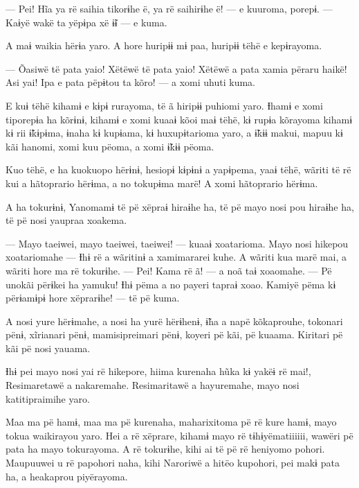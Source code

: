 
--- Pei! Hĩa ya rë saihia tikorɨhe ë, ya rë saihirɨhe ë! --- e kuuroma,
porepɨ. --- Kaɨyë wakë ta yëpɨpa xë ɨ̃ɨ --- e kuma. 

A maɨ waikia hërɨa yaro. A hore huripɨɨ mɨ paa, huripɨɨ tëhë e
kepɨrayoma. 


--- Õasiwë të pata yaio! Xëtëwë të pata yaio! Xëtëwë a pata xamia përaru
haikë! Asi yai! Ipa e pata pëpɨtou ta kõro! --- a xomi uhuti kuma. 

E kuɨ tëhë kihamɨ e kɨpɨ rurayoma, të ã hiripɨɨ puhiomi yaro. Ɨhamɨ e
xomi tiporepɨa ha kõrɨnɨ, kihamɨ e xomi kuaaɨ kõoi maɨ tëhë, kɨ rupɨa
kõrayoma kihamɨ kɨ rii ɨ̃kɨpɨma, ɨnaha kɨ kupɨama, kɨ huxupɨtarioma yaro,
a ɨ̃kɨɨ makui, mapuu kɨ kãi hanomi, xomi kuu pëoma, a xomi ɨ̃kɨɨ pëoma. 

Kuo tëhë, e ha kuokuopo hërɨnɨ, hesiopɨ kɨpɨnɨ a yapɨpema, yaaɨ tëhë,
wãriti të rë kui a hãtoprario hërɨma, a no tokupɨma marë! A xomi
hãtoprario hërɨma. 

A ha tokurɨnɨ, Yanomamɨ të pë xëpraɨ hiraɨhe ha, të pë mayo nosi pou
hiraɨhe ha, të pë nosi yaupraa xoakema. 

--- Mayo taeiwei, mayo taeiwei, taeiwei! --- kuaaɨ xoatarioma. Mayo nosi
hikepou xoatariomahe --- Ɨhɨ rë a wãritinɨ a xamimararei kuhe. A wãriti
kua marë mai, a wãriti hore ma rë tokurɨhe. --- Pei! Kama rë ã! --- a
noã taɨ xoaomahe. --- Pë unokãi përɨkei ha yamuku! Ɨhɨ pëma a no payeri
tapraɨ xoao. Kamiyë pëma kɨ përɨamɨpɨ hore xëprarɨhe! --- të pë kuma. 

A nosi yure hërɨmahe, a nosi ha yurë hërɨhenɨ, ɨ̃ha a napë kõkaprouhe,
tokonari pënɨ, xĩrianari pënɨ, mamisipreimari pënɨ, koyeri pë kãi, pë
kuaama. Kiritari pë kãi pë nosi yauama. 

Ɨhɨ pei mayo nosi yai rë hikepore, hiima kurenaha hũka kɨ yakëɨ rë mai!,
Resimaretawë a nakaremahe. Resimaritawë a hayuremahe, mayo nosi
katitipraimihe yaro. 

Maa ma pë hamɨ, maa ma pë kurenaha, maharixitoma pë rë kure hamɨ, mayo
tokua waikirayou yaro. Hei a rë xëprare, kihamɨ mayo rë tɨhɨyëmatiiiiii,
wawëri pë pata ha mayo tokurayoma. A rë tokurɨhe, kihi ai të pë rë
heniyomo pohori. Maupuuwei u rë papohori naha, kihi Naroriwë a hitëo
kupohori, pei makɨ pata ha, a heakaprou piyërayoma. 

